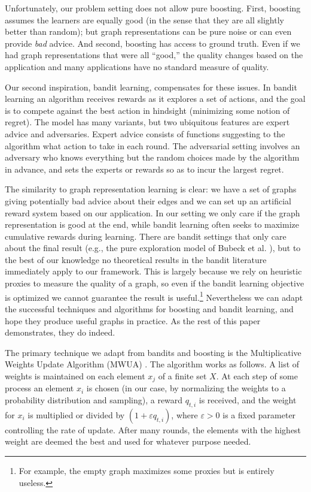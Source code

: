 \documentclass[twoside,twocolumn]{article}
\begin{document}
Unfortunately, our problem setting does not allow pure boosting. First,
boosting assumes the learners are equally good (in the sense that they are all
slightly better than random); but graph representations can be pure noise or
can even provide \emph{bad} advice. And second, boosting has access to ground
truth. Even if we had graph representations that were all ``good,'' the quality
changes based on the application and many applications have no standard measure
of quality. 

Our second inspiration, bandit learning, compensates for these issues.  In
bandit learning an algorithm receives rewards as it explores a set of actions,
and the goal is to compete against the best action in hindsight (minimizing
some notion of regret).  The model has many variants, but two ubiquitous
features are expert advice and adversaries.  Expert advice consists of
functions suggesting to the algorithm what action to take in each round. The
adversarial setting involves an adversary who knows everything but the random
choices made by the algorithm in advance, and sets the experts or rewards so as
to incur the largest regret. 

The similarity to graph representation learning is clear: we have a set of
graphs giving potentially bad advice about their edges and we can set up an
artificial reward system based on our application. In our setting we only care
if the graph representation is good at the end, while bandit learning often
seeks to maximize cumulative rewards during learning. There are bandit settings
that only care about the final result (e.g., the pure exploration model of 
Bubeck et al. \cite{Bubeck09}), but to the best of our knowledge no theoretical
results in the bandit literature immediately apply to our framework. This is
largely because we rely on heuristic proxies to measure the quality of a graph,
so even if the bandit learning objective is optimized we cannot guarantee 
the result is useful.\footnote{For example, the empty graph maximizes
some proxies but is entirely useless.} Nevertheless we can adapt the successful
techniques and algorithms for boosting and bandit learning, and hope they
produce useful graphs in practice. As the rest of this paper demonstrates, they
do indeed.

The primary technique we adapt from bandits and boosting is the Multiplicative
Weights Update Algorithm (MWUA) \cite{Arora12}. The algorithm works as follows.
A list of weights is maintained on each element $x_j$ of a finite set $X$. At
each step of some process an element $x_i$ is chosen (in our case, by
normalizing the weights to a probability distribution and sampling), a reward
$q_{t,i}$ is received, and the weight for $x_i$ is multiplied or divided by $(1
+ \varepsilon q_{t,i})$, where $\varepsilon >0$ is a fixed parameter
controlling the rate of update. After many rounds, the elements with the
highest weight are deemed the best and used for whatever purpose needed. 
\end{document}
